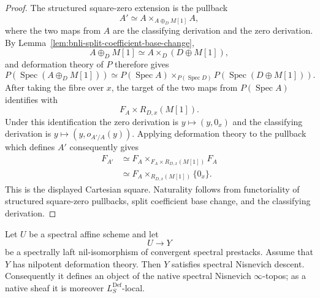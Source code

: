 \begin{proof}
The structured square-zero extension is the pullback
\[
    A'
    \simeq
    A\times_{A\oplus_DM[1]}A,
\]
where the two maps from $A$ are the classifying derivation and the zero
derivation.  By
Lemma~\ref{lem:bnli-split-coefficient-base-change},
\[
    A\oplus_DM[1]
    \simeq
    A\times_D(D\oplus M[1]),
\]
and deformation theory of $P$ therefore gives
\[
    P(\operatorname{Spec}(A\oplus_DM[1]))
    \simeq
    P(\operatorname{Spec}A)
    \times_{P(\operatorname{Spec}D)}
    P(\operatorname{Spec}(D\oplus M[1])).
\]
After taking the fibre over $x$, the target of the two maps from
$P(\operatorname{Spec}A)$ identifies with
\[
    F_A\times R_{D,x}(M[1]).
\]
Under this identification the zero derivation is
$y\mapsto(y,0_x)$ and the classifying derivation is
$y\mapsto(y,o_{A'/A}(y))$.  Applying deformation theory to the pullback
which defines $A'$ consequently gives
\[
\begin{aligned}
    F_{A'}
    &\simeq
    F_A
    \times_{F_A\times R_{D,x}(M[1])}
    F_A\\
    &\simeq
    F_A\times_{R_{D,x}(M[1])}\{0_x\}.
\end{aligned}
\]
This is the displayed Cartesian square.  Naturality follows from functoriality
of structured square-zero pullbacks, split coefficient base change, and the
classifying derivation.
\end{proof}

\begin{theorem}
\label{thm:bnli-formal-stack-nisnevich}
Let $U$ be a spectral affine scheme and let
\[
    U\longrightarrow Y
\]
be a spectrally laft nil-isomorphism of convergent spectral prestacks.  Assume
that $Y$ has nilpotent deformation theory.  Then $Y$ satisfies spectral
Nisnevich descent.  Consequently it defines an object of the native spectral
Nisnevich $\infty$-topos; as a native sheaf it is moreover
$L_S^{\mathrm{Def}}$-local.
\end{theorem}

